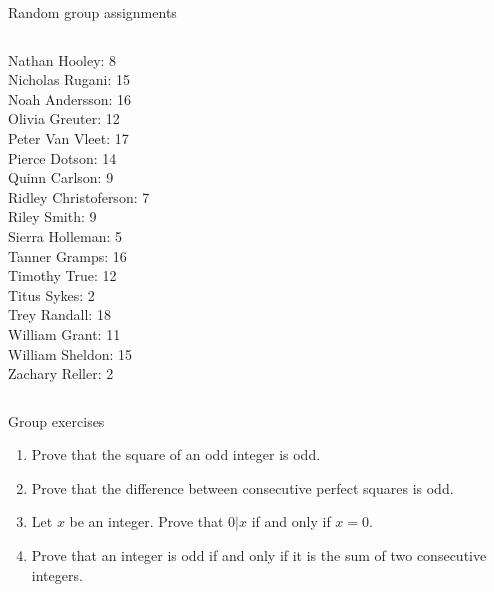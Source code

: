 \documentclass[10pt]{beamer}
\begin{document}
\begin{frame}{Random group assignments}
\begin{columns}
\begin{column}{0.33\textwidth}
Nathan Hooley: 8 \\ 
Nicholas Rugani: 15 \\ 
Noah Andersson: 16 \\ 
Olivia Greuter: 12 \\ 
Peter Van Vleet: 17 \\ 
Pierce Dotson: 14 \\ 
Quinn Carlson: 9 \\ 
Ridley Christoferson: 7 \\ 
Riley Smith: 9 \\ 
Sierra Holleman: 5 \\ 
Tanner Gramps: 16 \\ 
Timothy True: 12 \\ 
Titus Sykes: 2 \\ 
Trey Randall: 18 \\ 
William Grant: 11 \\ 
William Sheldon: 15 \\ 
Zachary Reller: 2 \\\end{column}
\end{columns}
\end{frame}


\begin{frame}{Group exercises}
\begin{enumerate}
	\item Prove that the square of an odd integer is odd.
	\item Prove that the difference between consecutive perfect squares is odd.
	\item Let $x$ be an integer.  Prove that $0|x$ if and only if $x=0$.
	\item Prove that an integer is odd if and only if it is the sum of two consecutive integers.
\end{enumerate}
	
\end{frame}
\end{document}
